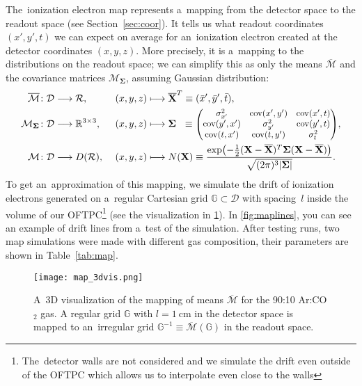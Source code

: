 		The~ionization electron map represents a~mapping from the detector space to the readout space (see Section~\ref{sec:coor}). It tells us what readout coordinates $(x',y',t)$ we can expect on average for an~ionization electron created at the detector coordinates $(x,y,z)$. More precisely, it is a~mapping to the distributions on the readout space; we can simplify this as only the means $\overline{\mathcal{M}}$ and the covariance matrices $\mathcal{M}_\mathbf{\Sigma}$, assuming Gaussian distribution:
			\begin{alignat}{3}
				\overline{\mathcal{M}}&\colon \mathcal{D} \longrightarrow \mathcal{R}, &&(x,y,z) \longmapsto \mathbf{\overline{X}}^T\equiv(\bar{x}',\bar{y}',\bar{t}),\\
				\mathcal{M}_\mathbf{\Sigma}&\colon \mathcal{D} \longrightarrow \mathbb{R}^{3\times3}, &&(x,y,z) \longmapsto \mathbf{\Sigma}^{\phantom{T}} \equiv \scalebox{0.9}{$\begin{pmatrix}
					\sigma_{x'}^2 & \operatorname{cov}(x',y') & \operatorname{cov}(x',t) \\
					\operatorname{cov}(y',x') & \sigma_{y'}^2 & \operatorname{cov}(y',t) \\
					\operatorname{cov}(t,x') & \operatorname{cov}(t,y') & \sigma_{t}^2
				\end{pmatrix}$},\\
				\mathcal{M}&\colon \mathcal{D} \longrightarrow D(\mathcal{R}),\ &&(x,y,z) \longmapsto N(\mathbf{X}) \equiv \frac{\exp(-\frac{1}{2}(\mathbf{X}-\mathbf{\overline{X}})^T\mathbf{\Sigma}(\mathbf{X}-\mathbf{\overline{X}}))}{\sqrt{(2\pi)^3 |\mathbf{\Sigma}|}}.
			\end{alignat}
		To get an~approximation of this mapping, we simulate the drift of ionization electrons generated on a~regular Cartesian grid $\mathbb{G}\subset\mathcal{D}$ with spacing~$l$ inside the volume of our \ac{OFTPC}\footnote{The~detector walls are not considered and we simulate the drift even outside of the \ac{OFTPC} which allows us to interpolate even close to the walls} (see the visualization in \cref{fig:map_3d}). In \cref{fig:maplines}, you can see an example of drift lines from a~test of the simulation. After testing runs, two map simulations were made with different gas composition, their parameters are shown in Table~\ref{tab:map}. 
		
		\begin{figure}
			\centering
			\texttt{[image: map\_3dvis.png]}
			\caption{A~3D visualization of the mapping of means $\overline{\mathcal{M}}$ for the 90:10 Ar:CO$_2$ gas. A regular grid $\mathbb{G}$ with $l = \SI{1}{\centi\meter}$ in the detector space is mapped to an~irregular grid $\mathbb{G}^{-1} \equiv \overline{\mathcal{M}}(\mathbb{G})$ in the readout space.}
			\label{fig:map_3d}
		\end{figure}
		
